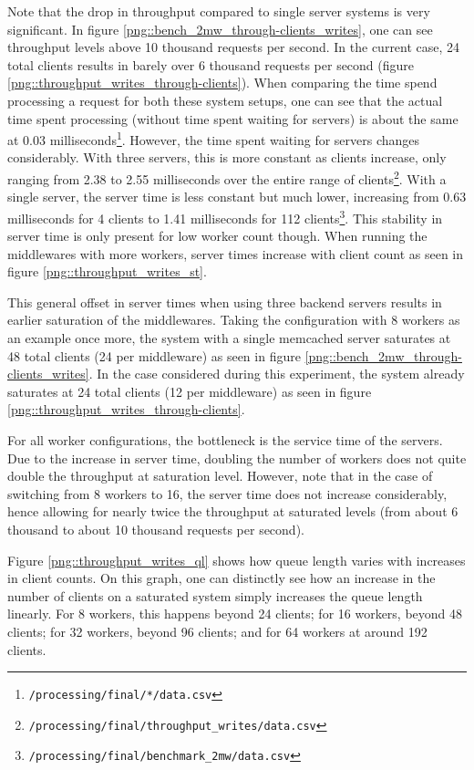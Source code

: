 \documentclass[11pt,a4paper]{article}
\begin{document}
Note that the drop in throughput compared to single server systems is very significant. In figure \ref{png::bench_2mw_through-clients_writes}, one can see throughput levels above 10 thousand requests per second. In the current case, 24 total clients results in barely over 6 thousand requests per second (figure \ref{png::throughput_writes_through-clients}). When comparing the time spend processing a request for both these system setups, one can see that the actual time spent processing (without time spent waiting for servers) is about the same at 0.03 milliseconds\footnote{\texttt{/processing/final/*/data.csv}}. However, the time spent waiting for servers changes considerably. With three servers, this is more constant as clients increase, only ranging from 2.38 to 2.55 milliseconds over the entire range of clients\footnote{\texttt{/processing/final/throughput_writes/data.csv}}. With a single server, the server time is less constant but much lower, increasing from 0.63 milliseconds for 4 clients to 1.41 milliseconds for 112 clients\footnote{\texttt{/processing/final/benchmark_2mw/data.csv}}. This stability in server time is only present for low worker count though. When running the middlewares with more workers, server times increase with client count as seen in figure \ref{png::throughput_writes_st}.

This general offset in server times when using three backend servers results in earlier saturation of the middlewares. Taking the configuration with 8 workers as an example once more, the system with a single memcached server saturates at 48 total clients (24 per middleware) as seen in figure \ref{png::bench_2mw_through-clients_writes}. In the case considered during this experiment, the system already saturates at 24 total clients (12 per middleware) as seen in figure \ref{png::throughput_writes_through-clients}.

For all worker configurations, the bottleneck is the service time of the servers. Due to the increase in server time, doubling the number of workers does not quite double the throughput at saturation level. However, note that in the case of switching from 8 workers to 16, the server time does not increase considerably, hence allowing for nearly twice the throughput at saturated levels (from about 6 thousand to about 10 thousand requests per second).

Figure \ref{png::throughput_writes_ql} shows how queue length varies with increases in client counts. On this graph, one can distinctly see how an increase in the number of clients on a saturated system simply increases the queue length linearly. For 8 workers, this happens beyond 24 clients; for 16 workers, beyond 48 clients; for 32 workers, beyond 96 clients; and for 64 workers at around 192 clients.
\end{document}
